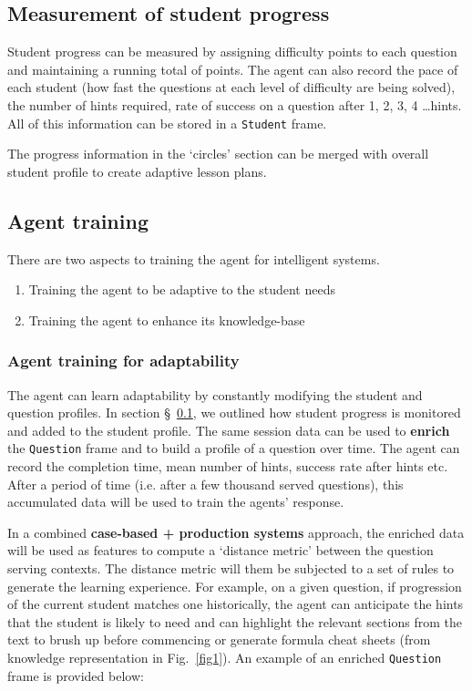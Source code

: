 \documentclass[10pt,letterpaper]{article}
\begin{document}
\subsection{Measurement of student progress}\label{student}
Student progress can be measured by assigning difficulty points to each question and maintaining a running total of points. The agent can also record the pace of each student (how fast the questions at each level of difficulty are being solved), the number of hints required, rate of success on a question after 1, 2, 3, 4 \ldots hints. All of this information can be stored in a {\tt Student} frame.

The progress information in the `circles' section can be merged with overall student profile to create adaptive lesson plans.

\subsection{Agent training}
There are two aspects to training the agent for intelligent systems. 
\begin{enumerate}
\item Training the agent to be adaptive to the student needs
\item Training the agent to enhance its knowledge-base
\end{enumerate}

\subsubsection{Agent training for adaptability}
The agent can learn adaptability by constantly modifying the student and question profiles. In section \S~\ref{student}, we outlined how student progress is monitored and added to the student profile. The same session data can be used to {\bf enrich} the {\tt Question} frame and to build a profile of a question over time. The agent can record the completion time, mean number of hints, success rate after hints etc. After a period of time (i.e. after a few thousand served questions), this accumulated data will be used to train the agents' response. 

In a combined {\bf case-based + production systems} approach, the enriched data will be used as features to compute a `distance metric' between the question serving contexts. The distance metric will them be subjected to a set of rules to generate the learning experience. For example, on a given question, if progression of the current student matches one historically, the agent can anticipate the hints that the student is likely to need and can highlight the relevant sections from the text to brush up before commencing or generate formula cheat sheets (from knowledge representation in Fig.~\ref{fig1}). An example of an enriched {\tt Question} frame is provided below:
\end{document}
